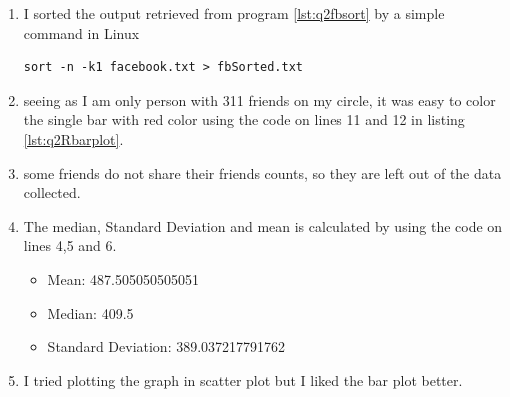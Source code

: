 \begin{enumerate}
\item I sorted the output retrieved from program \ref{lst:q2fbsort} by a simple command in Linux 
\begin{lstlisting}[frame=single]
 sort -n -k1 facebook.txt > fbSorted.txt
\end{lstlisting}
\item seeing as I am only person with 311 friends on my circle, it was easy to color the single bar with red color using the code on lines 11 and 12 in listing \ref{lst:q2Rbarplot}.
\item some friends do not share their friends counts, so they are left out of the data collected.
\item The median, Standard Deviation and mean is calculated by using the code on lines 
4,5 and 6.
	\begin{itemize}
		\item Mean:  487.505050505051
		\item Median:  409.5
		\item Standard Deviation:  389.037217791762
	\end{itemize}
	
\item I tried plotting the graph in scatter plot but I liked the bar plot better.
\end{enumerate}
\newpage

\newpage


\newpage

\newpage


